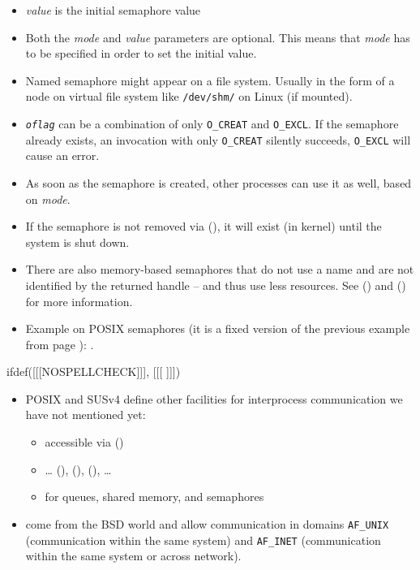 \begin{itemize}
\item \emph{value} is the initial semaphore value
\item Both the \emph{mode} and \emph{value} parameters are optional. This means
that \emph{mode} has to be specified in order to set the initial value.
\item Named semaphore might appear on a file system. Usually in the form of
a node on virtual file system like \texttt{/dev/shm/} on Linux (if mounted).
\item \emph{\texttt{oflag}} can be a combination of only \texttt{O\_CREAT} and
\texttt{O\_EXCL}.  If the semaphore already exists, an invocation with only
\texttt{O\_CREAT} silently succeeds, \texttt{O\_EXCL} will cause an error.
\item As soon as the semaphore is created, other processes can use it as
well, based on \emph{mode}.
\item If the semaphore is not removed via (), it will exist
(in kernel) until the system is shut down.
\item There are also memory-based semaphores that do not use a name and are not
identified by the returned handle -- and thus use less resources.  See
() and () for more information.
\item Example on POSIX semaphores (it is a fixed version of the previous example
 from page \pageref{RACE_C}):
.
\end{itemize}


ifdef([[[NOSPELLCHECK]]], [[[
]]])

\begin{slide}
\begin{itemize}
\item POSIX and SUSv4 define other facilities for interprocess communication we
have not mentioned yet:
    \begin{itemize}
    \item {} accessible via ()
    \item {} \dots{} (),
    (), (), \dots{} 
    \item {} for queues, shared memory, and semaphores
    \end{itemize}
\item {} come from the BSD world and allow communication in domains
\texttt{AF\_UNIX} (communication within the same system) and \texttt{AF\_INET}
(communication within the same system or across network).
\end{itemize}
\end{slide}

